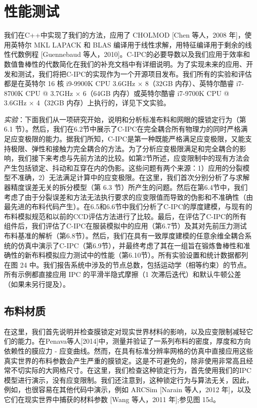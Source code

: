 \section{性能测试}

我们在C++中实现了我们的方法，应用了 CHOLMOD [Chen 等人，2008 年]，使用英特尔 MKL LAPACK 和 BLAS 编译用于线性求解，用特征编译用于剩余的线性代数例程 [Guennebaud 等人，2010]。C-IPC的必要导数以及我们应用于效率和数值鲁棒性的代数简化在我们的补充文档中有详细说明。为了实现未来的应用、开发和测试，我们将把C-IPC的实现作为一个开源项目发布。我们所有的实验和评估都是在英特尔 16 核 i9-9900K CPU 3.6GHz × 8（32GB 内存）、英特尔酷睿 i7-8700K CPU @ 3.7GHz × 6（64GB 内存）或英特尔酷睿 i7-9700K CPU @ 3.6GHz × 4（32GB 内存）上执行的，详见下文实验。

\textit{实验}：下面我们从一项研究开始，说明和分析标准布料和网眼的膜锁定行为（第 6.1 节）。然后，我们在6.2节中展示了C-IPC在完全耦合所有物理力的同时严格满足应变极限的能力。据我们所知，C-IPC是第一种既能严格满足应变极限，又能支持极限、弹性和接触力完全耦合的方法。为了分析应变极限满足和完全耦合的影响，我们接下来考虑与先前方法的比较。如第2节所述，应变限制中的现有方法会产生包括锁定、抖动和互穿在内的伪影。这些问题有两个来源：1）应用的分裂模型不准确，2）无法满足计算中的应变极限。在这里，我们首次分别分析了与求解器精度误差无关的拆分模型（第 6.3 节）所产生的问题。然后在第6.4节中，我们考虑了由于分裂误差和方法无法执行要求的应变限值而导致的伪影和不准确性（由最先进的布料代码产生）。在6.5和6.6节中我们分析了C-IPC的厚度建模，与现有的布料模拟规范和以前的CCD评估方法进行了比较。最后，在评估了C-IPC的所有组件后，我们评估了C-IPC在服装模拟中的应用（第6.7节）及其对先前压力测试布料基准的解析（第6.8节）。然后，我们在具有一致厚度建模的任意余维全耦合系统的仿真中演示了C-IPC（第6.9节），并最终考虑了其在一组旨在锻炼鲁棒性和准确性的新布料模拟应力测试中的性能（第6.10节）。所有实验设置和统计数据都列在图 24 中。我们报告系统中涉及的节点总数，包括运动学（相等约束）的节点。所有示例都直接应用 IPC 的平滑半隐式摩擦（1 次滞后迭代）和默认牛顿公差（如果未另行提及）。

\subsection{布料材质}

在这里，我们首先说明并检查膜锁定对现实世界材料的影响，以及应变限制减轻它们的能力。在Penava等人[2014]中，测量并验证了一系列布料的密度，厚度和方向依赖性的膜应力 - 应变曲线。然而，在具有标准分辨率网格的仿真中直接应用这些真实世界的布料参数会产生严重的膜锁定。这是不可避免的，除非使用非常高且经常不切实际的大网格尺寸。在这里，我们检查这种锁定行为，首先使用我们的IPC模型进行演示，没有应变限制。我们还注意到，这种锁定行为与算法无关，因此，例如，也很容易在其他代码中演示，例如 ARCSim [Narain 等人，2012 年]，以及它们在现实世界中捕获的材料参数 [Wang 等人，2011 年];参见图 15d。

